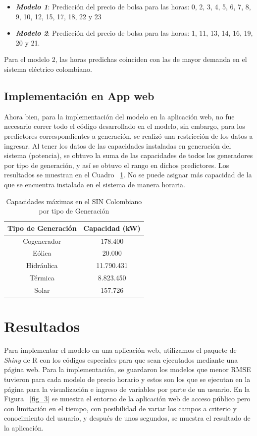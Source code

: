 \documentclass[conference, 10pt]{IEEEtran}
\begin{document}
\begin{itemize}
\item \textit{\textbf{Modelo 1}}: Predicción del precio de bolsa para las horas: 0, 2, 3, 4, 5, 6, 7, 8, 9, 10, 12, 15, 17, 18, 22 y 23\item\textit{\textbf{Modelo 2}}: Predicción del precio de bolsa para las horas: 1, 11, 13, 14, 16, 19, 20 y 21.
\end{itemize}

Para el modelo 2, las horas predichas coinciden con las de mayor demanda en el sistema eléctrico colombiano. 

\subsection{Implementación en App web}
Ahora bien, para la implementación del modelo en la aplicación web, no fue necesario correr todo el código desarrollado en el modelo, sin embargo, para los predictores correspondientes a generación, se realizó una restricción de los datos a ingresar. Al tener los datos de las capacidades instaladas en generación del sistema (potencia), se obtuvo la suma de las capacidades de todos los generadores por tipo de generación, y así se obtuvo el rango en dichos predictores. Los resultados se muestran en el Cuadro ~\ref{tab_10}. No se puede asignar más capacidad de la que se encuentra instalada en el sistema de manera horaria.

\begin{table}[htbp]
\caption{Capacidades máximas en el SIN Colombiano por tipo de Generación}
\begin{center}
\begin{tabular}{|c|c|}
\hline
 Tipo de Generación&Capacidad (kW)\\
\hline 
Cogenerador&178.400\\
\hline
Eólica&20.000\\
\hline
Hidráulica&11.790.431\\
\hline
Térmica&8.823.450\\
\hline
Solar&157.726\\
  
	\hline
\end{tabular}
\label{tab_10}
\end{center}
\end{table}
  
\section{Resultados}
Para implementar el modelo en una aplicación web, utilizamos el paquete de \textit{Shiny} de R con los códigos especiales para que sean ejecutados mediante una página web. Para la implementación, se guardaron los modelos que menor RMSE tuvieron para cada modelo de precio horario y estos son los que se ejecutan en la página para la visualización e ingreso de variables por parte de un usuario. En la Figura ~\ref{fig_3} se muestra el entorno de la aplicación web de acceso público pero con limitación en el tiempo, con posibilidad de variar los campos a criterio y conocimiento del usuario, y después de unos segundos, se muestra el resultado de la aplicación. 
\end{document}
